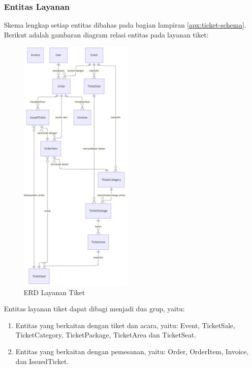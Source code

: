 \pagebreak

\subsubsection{Entitas Layanan}

Skema lengkap setiap entitas dibahas pada bagian lampiran \ref{apx:ticket-schema}. Berikut adalah gambaran diagram relasi entitas pada layanan tiket:

\begin{figure}[htbp]
    \centering
    \includegraphics[width=0.5\textwidth]{resources/chapter-3/erd-mini.png}
    \caption{ERD Layanan Tiket}
    \label{fig:erd-ticket-service}
\end{figure}

Entitas layanan tiket dapat dibagi menjadi dua grup, yaitu:

\begin{enumerate}
    \item Entitas yang berkaitan dengan tiket dan acara, yaitu: Event, TicketSale, TicketCategory, TicketPackage, TicketArea dan TicketSeat.
    \item Entitas yang berkaitan dengan pemesanan, yaitu: Order, OrderItem, Invoice, dan IssuedTicket.
\end{enumerate}

